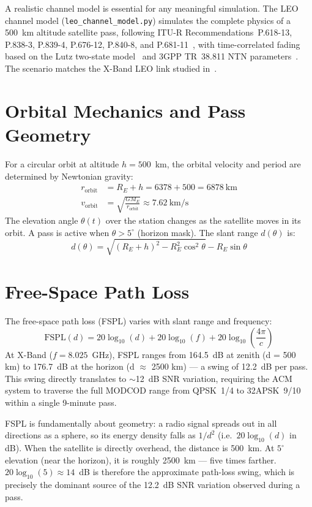 \documentclass[12pt,a4paper]{report}
\begin{document}
A realistic channel model is essential for any meaningful simulation. The LEO
channel model (\texttt{leo\_channel\_model.py}) simulates the complete physics
of a 500~km altitude satellite pass, following ITU-R Recommendations~P.618-13,
P.838-3, P.839-4, P.676-12, P.840-8, and P.681-11~\cite{itu_p618,itu_p838,
itu_p839,itu_p676,itu_p840,itu_p681}, with time-correlated fading based on
the Lutz two-state model~\cite{lutz1991} and 3GPP TR~38.811 NTN parameters~\cite{3gpp_tr38811}.
The scenario matches the X-Band LEO link studied in~\cite{magro2025,altunc2015,wang2022sensors}.

\section{Orbital Mechanics and Pass Geometry}

For a circular orbit at altitude $h = 500$~km, the orbital velocity and period
are determined by Newtonian gravity:
\begin{align}
    r_\text{orbit} &= R_E + h = 6378 + 500 = 6878~\text{km} \\
    v_\text{orbit} &= \sqrt{\frac{GM_E}{r_\text{orbit}}} \approx 7.62~\text{km/s}
\end{align}
The elevation angle $\theta(t)$ over the station changes as the satellite moves
in its orbit. A pass is active when $\theta > 5^\circ$ (horizon mask). The
slant range $d(\theta)$ is:
\begin{equation}
    d(\theta) = \sqrt{(R_E + h)^2 - R_E^2\cos^2\theta} - R_E\sin\theta
\end{equation}

\section{Free-Space Path Loss}

The free-space path loss (FSPL) varies with slant range and frequency:
\begin{equation}
    \text{FSPL}(d) = 20\log_{10}(d) + 20\log_{10}(f) + 20\log_{10}\!\left(\frac{4\pi}{c}\right)
\end{equation}
At X-Band ($f = 8.025$~GHz), FSPL ranges from 164.5~dB at zenith (d = 500 km)
to 176.7~dB at the horizon (d $\approx$ 2500 km) --- a swing of 12.2~dB per
pass. This swing directly translates to $\sim$12~dB SNR variation, requiring
the ACM system to traverse the full MODCOD range from QPSK~1/4 to 32APSK~9/10
within a single 9-minute pass.

\begin{plainenglish}
FSPL is fundamentally about geometry: a radio signal spreads out in all directions
as a sphere, so its energy density falls as $1/d^2$ (i.e.\ $20\log_{10}(d)$ in
dB).  When the satellite is directly overhead, the distance is 500~km.  At
$5^\circ$ elevation (near the horizon), it is roughly 2500~km --- five times
farther.  $20\log_{10}(5) \approx 14$~dB is therefore the approximate path-loss
swing, which is precisely the dominant source of the 12.2~dB SNR variation
observed during a pass.
\end{plainenglish}
\end{document}
